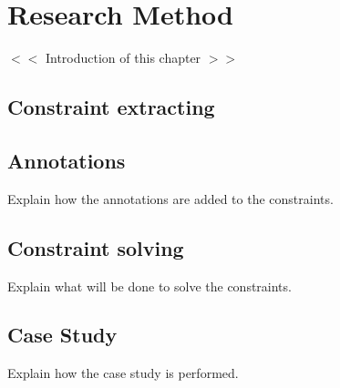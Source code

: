 \documentclass[../main.tex]{subfiles}
\begin{document}
    \chapter{Research Method}\label{chap:research_method}
    $<<$ Introduction of this chapter $>>$
       
    \section{Constraint extracting}
    
    \section{Annotations}
    Explain how the annotations are added to the constraints.
    \Blindtext
    
    \section{Constraint solving}
    Explain what will be done to solve the constraints.
    \\
    \Blindtext
    
    \section{Case Study}
    Explain how the case study is performed.
    \\
    \Blindtext
\end{document}
